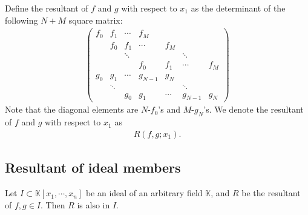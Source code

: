 \documentclass[11pt]{book}
\begin{document}
Define the resultant of $f$ and $g$ with respect to $x_1$ as the determinant of the following $N+M$ square matrix:
\begin{eqnarray}
\left(\begin{array}{ccccccc} f_0 & f_1 & \cdots  & f_M &   &   &   \\ & f_0 & f_1 & \cdots  & f_M &   &   \\  &   & \ddots  &   &   & \ddots  &   \\  &   &   &  f_0 & f_1 & \cdots  & f_M  \\ g_0  & g_1   & \cdots  & g_{N-1}  &g_N&   &   \\  &  \ddots &   &   &   &  \ddots &   \\  &   &  g_0 &  g_1 & \cdots  & g_{N-1}  & g_N \end{array}\right)
\end{eqnarray}
Note that the diagonal elements are $N$-$f_0$'s and $M$-$g_N$'s.
We denote the resultant of $f$ and $g$ with respect to $x_1$ as
\begin{eqnarray}
R(f,g; x_1).
\end{eqnarray}


\subsection{Resultant of ideal members}
\label{ResultantOfIdeal}
Let $I \subset \mathbb{K}[x_1, \cdots, x_n]$ be an ideal of an arbitrary field $\mathbb{K}$, and $R$ be the resultant of $f,g \in I$.
Then $R$ is also in $I$.
\end{document}
